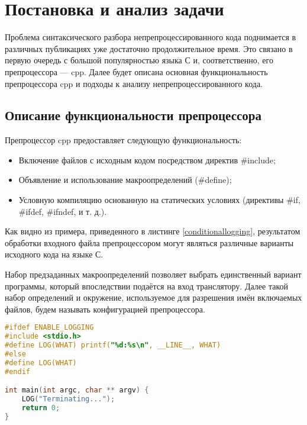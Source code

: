 \clearpage

\section{Постановка и анализ задачи}

Проблема синтаксического разбора непрепроцессированного кода поднимается в различных публикациях уже достаточно продолжительное время. Это связано в первую очередь с большой популярностью языка С и, соответственно, его препроцессора --- cpp. Далее будет описана основная функциональность препроцессора cpp и подходы к анализу непрепроцессированного кода.

\subsection{Описание функциональности препроцессора}

Препроцессор cpp предоставляет следующую функциональность: 

\begin{itemize}
\item Включение файлов с исходным кодом посредством директив \#include; 
\item Объявление и использование макроопределений (\#define); 
\item Условную компиляцию основанную на статических условиях (директивы \#if, \#ifdef, \#ifndef, и т. д.).
\end{itemize}

Как видно из примера, приведенного в листинге \ref{conditionallogging}, результатом обработки входного файла препроцессором могут являться различные варианты исходного кода на языке С. 

Набор предзаданных макроопределений позволяет выбрать единственный вариант программы, который впоследствии подаётся на вход транслятору. Далее такой набор определений и окружение, используемое для разрешения имён включаемых файлов, будем называть конфигурацией препроцессора.

\begin{minipage}{\linewidth}
\begin{lstlisting}[caption={Условная компиляция},label=conditionallogging,language=C,basicstyle=\small]
#ifdef ENABLE_LOGGING 
#include <stdio.h>
#define LOG(WHAT) printf("%d:%s\n", __LINE__, WHAT)
#else
#define LOG(WHAT) 
#endif

int main(int argc, char ** argv) {
	LOG("Terminating...");
	return 0;	
}
\end{lstlisting}
\end{minipage}

